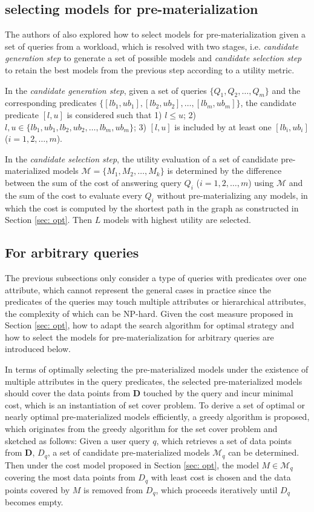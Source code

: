 \subsection{selecting models for pre-materialization}\label{sec: select_models}
The authors of \cite{hasani2018efficient} also explored how to select models for pre-materialization given a set of queries from a workload, which is resolved with two stages, i.e. {\em candidate generation step} to generate a set of possible models and {\em candidate selection step} to retain the best models from the previous step according to a utility metric.

In the {\em candidate generation step}, given a set of queries $\{Q_1, Q_2, \dots, Q_m\}$ and the corresponding predicates $\{[lb_1, ub_1], [lb_2, ub_2], \dots, [lb_m, ub_m]\}$, the candidate predicate $[l, u]$ is considered such that 1) $l \leq u$; 2) $l, u \in \{lb_1, ub_1, lb_2, ub_2, \dots, lb_m, ub_m\}$; 3) $[l, u]$ is included by at least one $[lb_i, ub_i]$ ($i=1,2,\dots, m$).

In the {\em candidate selection step}, the utility evaluation of a set of candidate pre-materialized models $\mathcal{M} = \{M_1, M_2, \dots, M_k\}$ is determined by the difference between the sum of the cost of answering query $Q_i$ ($i=1,2,\dots, m$) using $\mathcal{M}$ and the sum of the cost to evaluate every $Q_i$ without pre-materializing any models, in which the cost is computed by the shortest path in the graph as constructed in Section \ref{sec: opt}. Then $L$ models with highest utility are selected.

\subsection{For arbitrary queries}
The previous subsections only consider a type of queries with predicates over one attribute, which cannot represent the general cases in practice since the predicates of the queries may touch multiple attributes or hierarchical attributes, the complexity of which can be NP-hard. Given the cost measure proposed in Section \ref{sec: opt}, how to adapt the search algorithm for optimal strategy and how to select the models for pre-materialization for arbitrary queries are introduced below.

In terms of optimally selecting the pre-materialized models under the existence of multiple attributes in the query predicates, the selected pre-materialized models should cover the data points from $\textbf{D}$ touched by the query and incur minimal cost, which is an instantiation of set cover problem. To derive a set of optimal or nearly optimal pre-materialized models efficiently, a greedy algorithm is proposed, which originates from the greedy algorithm for the set cover problem and sketched as follows: Given a user query $q$, which retrieves a set of data points from $\textbf{D}$, $D_q$, a set of candidate pre-materialized models $\mathcal{M}_q$ can be determined. Then under the cost model proposed in Section \ref{sec: opt}, the model $M \in \mathcal{M}_q$ covering the most data points from $D_q$ with least cost is chosen and the data points covered by $M$ is removed from $D_q$, which proceeds iteratively until $D_q$ becomes empty.

